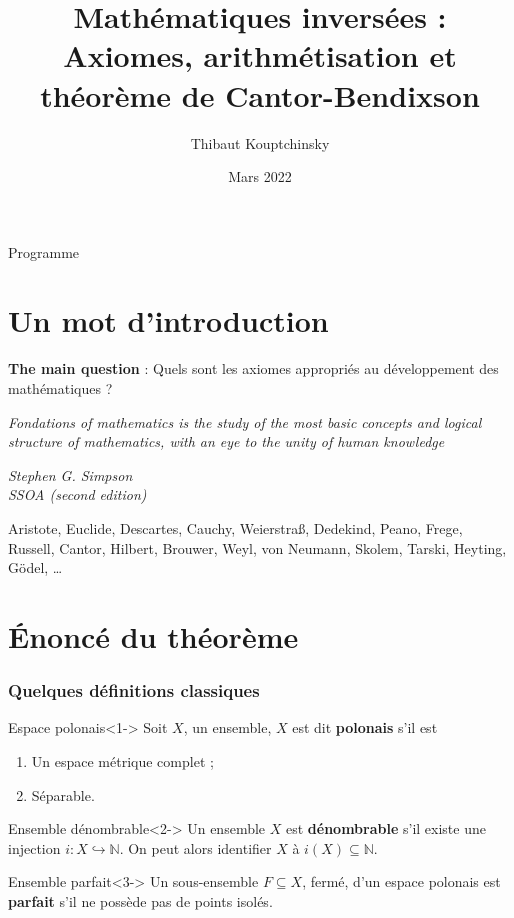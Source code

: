 \documentclass{beamer} %
\title[Axiomes et arithmétisation pour Cantor-Bendixson]{Mathématiques inversées : Axiomes, arithmétisation et théorème de Cantor-Bendixson}
\institute[LMAT2165]{Projet personnel et séminaire de master 1}
\author{Thibaut Kouptchinsky}
\date{Mars 2022}
\newcommand{\N}{\mathbb{N}}
\begin{document}
\begin{frame}
	\titlepage
\end{frame}


\begin{frame}{Programme}
    \tableofcontents
\end{frame}


\section{Un mot d'introduction}



\begin{frame}{\textbf{The main question} : Quels sont les axiomes appropriés au développement des mathématiques ? }

        \epigraph{\textit{Fondations of mathematics is the study of the most basic concepts and logical structure of mathematics, with an eye to the unity of human knowledge}}{\textit{Stephen G. Simpson \\ SSOA (second edition)}}
\pause Aristote, Euclide, Descartes, Cauchy, Weierstraß, Dedekind, Peano, Frege, Russell, Cantor, Hilbert, Brouwer, Weyl, von Neumann, Skolem, Tarski, Heyting, Gödel, \dots 

\end{frame}


%
\section{\'Enoncé du théorème}
\begin{frame}
    \frametitle{Quelques définitions classiques}
    \begin{block}{Espace polonais}<1->
        Soit $X$, un ensemble, $X$ est dit \textbf{polonais} s'il est \begin{enumerate}
            \item Un espace métrique complet ;
            \item Séparable.
        \end{enumerate}
    \end{block}
    \begin{block}{Ensemble dénombrable}<2->
        Un ensemble $X$ est \textbf{dénombrable} s'il existe une injection $i : X \hookrightarrow \N$. On peut alors identifier $X$ à $i(X) \subseteq \N$.
    \end{block}
    \begin{block}{Ensemble parfait}<3->
        Un sous-ensemble $F \subseteq X$, fermé, d'un espace polonais est \textbf{parfait} s'il ne possède pas de points isolés.
    \end{block}
    
\end{frame}
\end{document}
